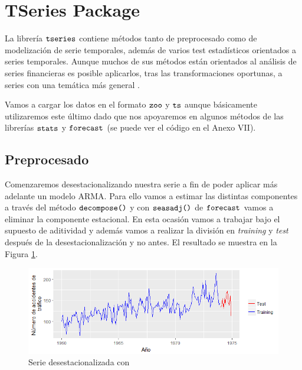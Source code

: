 \section{TSeries Package}
La librería $\verb!tseries!$ contiene métodos tanto de preprocesado como de modelización de serie temporales, además de varios test estadísticos orientados a series temporales. Aunque muchos de sus métodos están orientados al análisis de series financieras es posible aplicarlos, tras las transformaciones oportunas, a series con una temática más general \cite{tseries}.

Vamos a cargar los datos en el formato $\verb!zoo!$ y $\verb!ts!$ aunque básicamente utilizaremos este último dado que nos apoyaremos en algunos métodos de las librerías $\verb!stats!$ y $\verb!forecast!$ (se puede ver el código en el Anexo VII).

\subsection{Preprocesado}
Comenzaremos desestacionalizando nuestra serie a fin de poder aplicar más adelante un modelo ARMA. Para ello vamos a estimar las distintas componentes a través del método $\verb!decompose()!$ y con $\verb!seasadj()!$ de $\verb!forecast!$ vamos a eliminar la componente estacional. En esta ocasión vamos a trabajar bajo el supuesto de aditividad y además vamos a realizar la división en \textit{training} y \textit{test} después de la desestacionalización y no antes. El resultado se muestra en la Figura \ref{acc_deses}.
\begin{figure}
    \centering
    \centerline{\includegraphics[scale = 0.7]{Images/Modelizacion/322.png}}
    \caption{Serie  desestacionalizada con }
    \label{acc_deses}
\end{figure}

